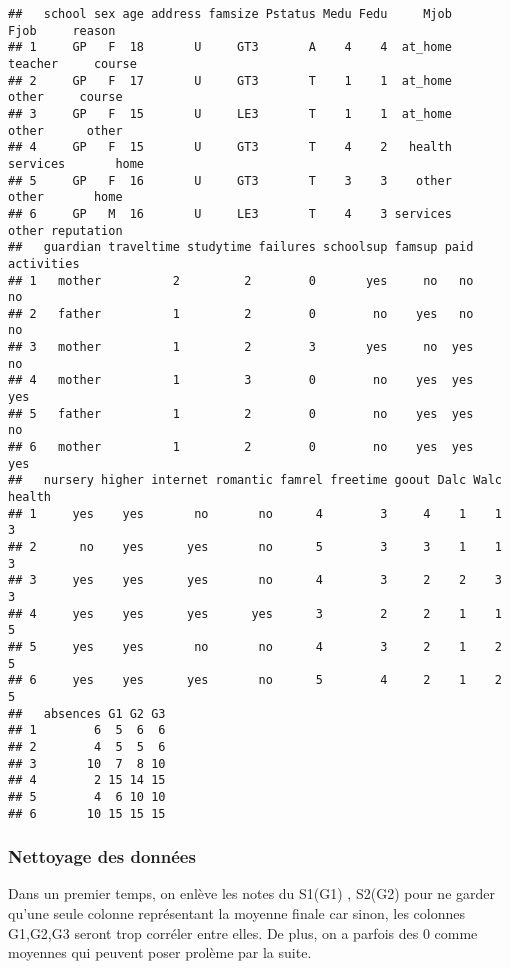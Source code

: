 \documentclass[
]{article}
\begin{document}
\begin{verbatim}
##   school sex age address famsize Pstatus Medu Fedu     Mjob     Fjob     reason
## 1     GP   F  18       U     GT3       A    4    4  at_home  teacher     course
## 2     GP   F  17       U     GT3       T    1    1  at_home    other     course
## 3     GP   F  15       U     LE3       T    1    1  at_home    other      other
## 4     GP   F  15       U     GT3       T    4    2   health services       home
## 5     GP   F  16       U     GT3       T    3    3    other    other       home
## 6     GP   M  16       U     LE3       T    4    3 services    other reputation
##   guardian traveltime studytime failures schoolsup famsup paid activities
## 1   mother          2         2        0       yes     no   no         no
## 2   father          1         2        0        no    yes   no         no
## 3   mother          1         2        3       yes     no  yes         no
## 4   mother          1         3        0        no    yes  yes        yes
## 5   father          1         2        0        no    yes  yes         no
## 6   mother          1         2        0        no    yes  yes        yes
##   nursery higher internet romantic famrel freetime goout Dalc Walc health
## 1     yes    yes       no       no      4        3     4    1    1      3
## 2      no    yes      yes       no      5        3     3    1    1      3
## 3     yes    yes      yes       no      4        3     2    2    3      3
## 4     yes    yes      yes      yes      3        2     2    1    1      5
## 5     yes    yes       no       no      4        3     2    1    2      5
## 6     yes    yes      yes       no      5        4     2    1    2      5
##   absences G1 G2 G3
## 1        6  5  6  6
## 2        4  5  5  6
## 3       10  7  8 10
## 4        2 15 14 15
## 5        4  6 10 10
## 6       10 15 15 15
\end{verbatim}

\hypertarget{nettoyage-des-donnuxe9es}{%
\subsubsection{Nettoyage des données}\label{nettoyage-des-donnuxe9es}}

Dans un premier temps, on enlève les notes du S1(G1) , S2(G2) pour ne
garder qu'une seule colonne représentant la moyenne finale car sinon,
les colonnes G1,G2,G3 seront trop corréler entre elles. De plus, on a
parfois des 0 comme moyennes qui peuvent poser prolème par la suite.
\end{document}
